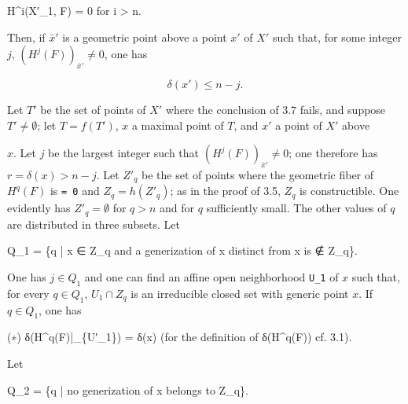 \documentclass[
  11pt,
  a4paper,
]{book}
\newenvironment{Shaded}{}{}
\newcommand{\NormalTok}[1]{#1}
\begin{document}
\begin{Shaded}
\begin{Highlighting}[]
\NormalTok{H\^{}i(X′\_1, F) = 0 for i \textgreater{} n.}
\end{Highlighting}
\end{Shaded}

Then, if \(\bar{x}'\) is a geometric point above a point \(x'\) of
\(X'\) such that, for some integer \(j\),
\((H^{j}(F))_{\bar{x}'} \neq 0\), one has

\[ \delta(x') \leqslant n - j. \]

Let \(T'\) be the set of points of \(X'\) where the conclusion of 3.7
fails, and suppose \(T' \neq \emptyset\); let \(T =
f(T')\), \(x\) a maximal point of \(T\), and \(x'\) a point of \(X'\)
above

\(x\). Let \(j\) be the largest integer such that
\((H^{j}(F))_{\bar{x}'} \neq 0\); one therefore has
\(r = \delta(x) > n - j\). Let \(Z'_{q}\) be the set of points where the
geometric fiber of \(H^{q}(F)\) is \texttt{=\ 0} and
\(Z_{q} = h(Z'_{q})\); as in the proof of 3.5, \(Z_{q}\) is
constructible. One evidently has \(Z'_{q} = \emptyset\) for \(q > n\)
and for \(q\) sufficiently small. The other values of \(q\) are
distributed in three subsets. Let

\begin{Shaded}
\begin{Highlighting}[]
\NormalTok{Q\_1 = \{q | x ∈ Z\_q and a generization of x distinct from x is ∉ Z\_q\}.}
\end{Highlighting}
\end{Shaded}

One has \(j \in Q_{1}\) and one can find an affine open neighborhood
\texttt{U\_1} of \(x\) such that, for every \(q \in Q_{1}\),
\(U_{1} \cap Z_{q}\) is an irreducible closed set with generic point
\(x\). If \(q \in Q_{1}\), one has

\begin{Shaded}
\begin{Highlighting}[]
\NormalTok{(∗)    δ(H\^{}q(F)|\_\{U′\_1\}) = δ(x)    (for the definition of δ(H\^{}q(F)) cf. 3.1).}
\end{Highlighting}
\end{Shaded}

Let

\begin{Shaded}
\begin{Highlighting}[]
\NormalTok{Q\_2 = \{q | no generization of x belongs to Z\_q\}.}
\end{Highlighting}
\end{Shaded}
\end{document}
